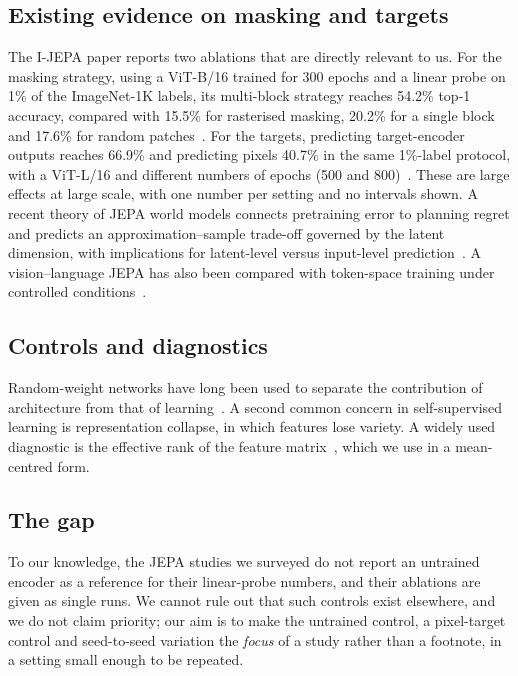 \documentclass[pdflatex,sn-basic]{sn-jnl}%
\begin{document}
\subsection{Existing evidence on masking and targets}\label{sec:evidence}
The I-JEPA paper reports two ablations that are directly relevant to us. For the masking strategy, using a ViT-B/16 trained for 300 epochs and a linear probe on 1\% of the ImageNet-1K labels, its multi-block strategy reaches 54.2\% top-1 accuracy, compared with 15.5\% for rasterised masking, 20.2\% for a single block and 17.6\% for random patches~\cite{assran2023ijepa}. For the targets, predicting target-encoder outputs reaches 66.9\% and predicting pixels 40.7\% in the same 1\%-label protocol, with a ViT-L/16 and different numbers of epochs (500 and 800)~\cite{assran2023ijepa}. These are large effects at large scale, with one number per setting and no intervals shown. A recent theory of JEPA world models connects pretraining error to planning regret and predicts an approximation--sample trade-off governed by the latent dimension, with implications for latent-level versus input-level prediction~\cite{cui2026theory}. A vision--language JEPA has also been compared with token-space training under controlled conditions~\cite{chen2025vljepa}.

\subsection{Controls and diagnostics}\label{sec:controls}
Random-weight networks have long been used to separate the contribution of architecture from that of learning~\cite{saxe2011random}. A second common concern in self-supervised learning is representation collapse, in which features lose variety. A widely used diagnostic is the effective rank of the feature matrix~\cite{garrido2023rankme}, which we use in a mean-centred form.

\subsection{The gap}\label{sec:gap}
To our knowledge, the JEPA studies we surveyed do not report an untrained encoder as a reference for their linear-probe numbers, and their ablations are given as single runs. We cannot rule out that such controls exist elsewhere, and we do not claim priority; our aim is to make the untrained control, a pixel-target control and seed-to-seed variation the \emph{focus} of a study rather than a footnote, in a setting small enough to be repeated.
\end{document}
